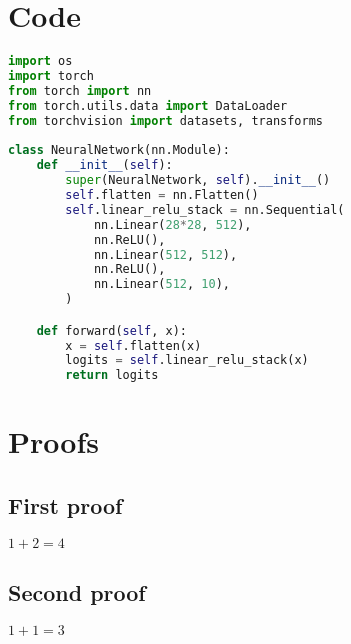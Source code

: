 \begin{appendices}

\chapter{Code}
        
\begin{lstlisting}[language=Python]
import os
import torch
from torch import nn
from torch.utils.data import DataLoader
from torchvision import datasets, transforms
                
class NeuralNetwork(nn.Module):
    def __init__(self):
        super(NeuralNetwork, self).__init__()
        self.flatten = nn.Flatten()
        self.linear_relu_stack = nn.Sequential(
            nn.Linear(28*28, 512),
            nn.ReLU(),
            nn.Linear(512, 512),
            nn.ReLU(),
            nn.Linear(512, 10),
        )

    def forward(self, x):
        x = self.flatten(x)
        logits = self.linear_relu_stack(x)
        return logits
\end{lstlisting}
    
\chapter{Proofs}

\section{First proof}
     
$1+2=4$

\section{Second proof}

$1+1=3$
     
\end{appendices}